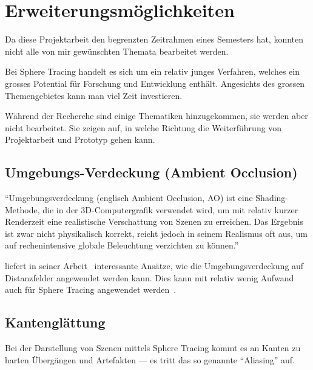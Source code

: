 
\section{Erweiterungsmöglichkeiten}
\label{sec:further_work}

Da diese Projektarbeit den begrenzten Zeitrahmen eines Semesters
hat, konnten nicht alle von mir gewünschten Themata bearbeitet werden.

Bei Sphere Tracing handelt es sich um ein relativ junges
Verfahren, welches ein grosses Potential für Forschung und
Entwicklung enthält. Angesichts des grossen Themengebietes kann man viel
Zeit investieren.

Während der Recherche sind einige Thematiken hinzugekommen, sie werden
aber nicht bearbeitet. Sie zeigen auf, in welche Richtung die
Weiterführung von Projektarbeit und Prototyp gehen kann.

\subsection{Umgebungs-Verdeckung (Ambient Occlusion)}
\label{subsec:further_work:ambient_occlusion}

``Umgebungsverdeckung (englisch Ambient Occlusion, AO) ist eine
Shading-Methode, die in der 3D-Computergrafik verwendet wird, um mit
relativ kurzer Renderzeit eine realistische Verschattung von Szenen zu
erreichen. Das Ergebnis ist zwar nicht physikalisch korrekt, reicht
jedoch in seinem Realismus oft aus, um auf rechenintensive globale
Beleuchtung verzichten zu
können.''~\parencite{wikipedia_the_free_encyclopedia_umgebungsverdeckung_2015}

\citeauthor{evans_fast_2006} liefert in seiner
Arbeit~ interessante Ansätze, wie die
Umgebungsverdeckung auf Distanzfelder angewendet werden kann. Dies kann
mit relativ wenig Aufwand auch für Sphere Tracing angewendet
werden~\parencite{evans_fast_2006}.

\subsection{Kantenglättung}
\label{subsec:further_work:antialiasing}

Bei der Darstellung von Szenen mittels Sphere Tracing kommt es an Kanten
zu harten Übergängen und Artefakten --- es tritt das so genannte
``Aliasing'' auf.

